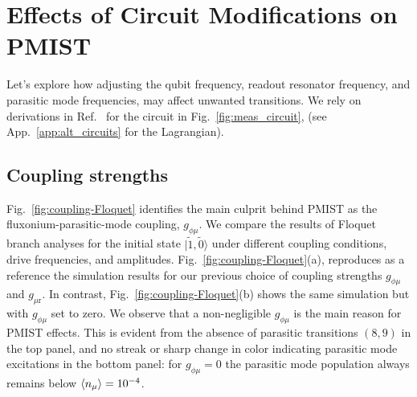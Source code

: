 \documentclass[%
reprint,
superscriptaddress,
 amsmath,amssymb,
 aps,
 prx,
longbibliography,
floatfix,
]{revtex4-2}
\begin{document}
\section{Effects of Circuit Modifications on PMIST}\label{sec:expressions}
Let's explore how adjusting the qubit frequency, readout resonator frequency, and parasitic mode frequencies, may affect unwanted transitions. We rely on derivations in Ref.~\cite{viola2015collective} for the circuit in Fig.~\ref{fig:meas_circuit}, (see App.~\ref{app:alt_circuits} for the Lagrangian).



\subsection{Coupling strengths} \label{sec:coupling}

Fig.~\ref{fig:coupling-Floquet} identifies the main culprit behind PMIST as the fluxonium-parasitic-mode coupling, $g_{\phi \mu}$. We compare the results of Floquet branch analyses for the initial state $|\tilde{1}, \tilde{0}\rangle$ under different coupling conditions, drive frequencies, and amplitudes. Fig.~\ref{fig:coupling-Floquet}(a), reproduces as a reference the simulation results for our previous choice of coupling strengths $g_{\phi\mu}$ and $g_{\mu \textrm{r}}$. In contrast, Fig.~\ref{fig:coupling-Floquet}(b) shows the same simulation but with $g_{\phi \mu}$ set to zero. We observe that a non-negligible $g_{\phi\mu}$ is the main reason for PMIST effects. This is evident from the absence of parasitic transitions $(8,9)$ in the top panel, and no streak or sharp change in color indicating parasitic mode excitations in the bottom panel:  for $g_{\phi \mu}=0$ the parasitic mode population always remains below $\braket{n_\mu}=10^{-4}$. 
\end{document}

